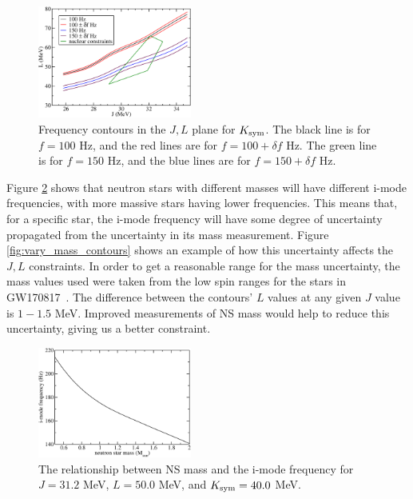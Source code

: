 \documentclass[fleqn,usenatbib]{mnras}
\begin{document}
\begin{figure}
\centering
\includegraphics[width=0.45\textwidth,angle=0]{f100_f150_tres_2.pdf}
\caption{Frequency contours in the $J,L$ plane for $K_{\rm sym}$. The black line is for $f=100$ Hz, and the red lines are for $f=100+\delta f$ Hz. The green line is for $f=150$ Hz, and the blue lines are for $f=150+\delta f$ Hz.}
\label{fig:t_res_spread}
\end{figure}

\hspace{\parindent}Figure \ref{fig:M_vs_f} shows that neutron stars with different masses will have different i-mode frequencies, with more massive stars having lower frequencies. This means that, for a specific star, the i-mode frequency will have some degree of uncertainty propagated from the uncertainty in its mass measurement. Figure \ref{fig:vary_mass_contours} shows an example of how this uncertainty affects the $J,L$ constraints. In order to get a reasonable range for the mass uncertainty, the mass values used were taken from the low spin ranges for the stars in GW170817~\citet{abbott2017merger}. The difference between the contours' $L$ values at any given $J$ value is $1-1.5$ MeV. Improved measurements of NS mass would help to reduce this uncertainty, giving us a better constraint.

\begin{figure}
\centering
\includegraphics[width=0.45\textwidth,angle=0]{M_vs_f}
\caption{The relationship between NS mass and the i-mode frequency for $J=31.2$ MeV, $L=50.0$ MeV, and $K_{\rm sym}=40.0$ MeV.}
\label{fig:M_vs_f}
\end{figure}
\end{document}
